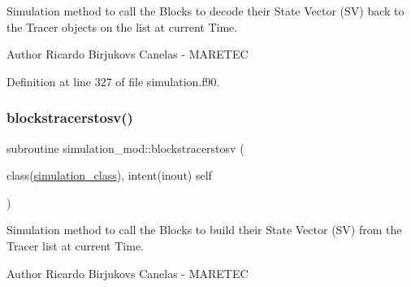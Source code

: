 Simulation method to call the Blocks to decode their State Vector (SV) back to the Tracer objects on the list at current Time. 

\begin{DoxyAuthor}{Author}
Ricardo Birjukovs Canelas -\/ M\+A\+R\+E\+T\+EC 
\end{DoxyAuthor}


Definition at line 327 of file simulation.\+f90.


\mbox{\label{namespacesimulation__mod_a2fbc294996a615647983ec637b83cfc0}} 
\subsubsection{\texorpdfstring{blockstracerstosv()}{blockstracerstosv()}}
{\footnotesize\ttfamily subroutine simulation\+\_\+mod\+::blockstracerstosv (\begin{DoxyParamCaption}\item[{class(\mbox{\hyperlink{structsimulation__mod_1_1simulation__class}{simulation\+\_\+class}}), intent(inout)}]{self }\end{DoxyParamCaption})\hspace{0.3cm}{\ttfamily [private]}}



Simulation method to call the Blocks to build their State Vector (SV) from the Tracer list at current Time. 

\begin{DoxyAuthor}{Author}
Ricardo Birjukovs Canelas -\/ M\+A\+R\+E\+T\+EC 
\end{DoxyAuthor}


